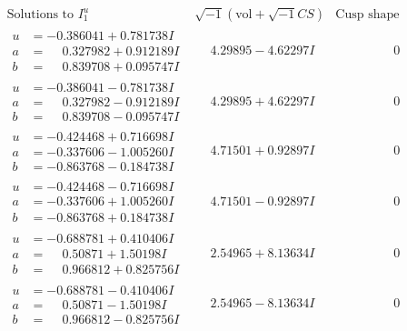 \documentclass[1p]{elsarticle_modified}
\theoremstyle{definition}
\newcommand{\I}{\sqrt{-1}}
\begin{document}
$$\begin{array}{c|c|c}  
\text{Solutions to }I^u_{1}& \I (\text{vol} + \sqrt{-1}CS) & \text{Cusp shape}\\
 \hline 
\begin{aligned}
u &= -0.386041 + 0.781738 I \\
a &= \phantom{-}0.327982 + 0.912189 I \\
b &= \phantom{-}0.839708 + 0.095747 I\end{aligned}
 & \phantom{-}4.29895 - 4.62297 I & \phantom{-0.000000 } 0 \\ \hline\begin{aligned}
u &= -0.386041 - 0.781738 I \\
a &= \phantom{-}0.327982 - 0.912189 I \\
b &= \phantom{-}0.839708 - 0.095747 I\end{aligned}
 & \phantom{-}4.29895 + 4.62297 I & \phantom{-0.000000 } 0 \\ \hline\begin{aligned}
u &= -0.424468 + 0.716698 I \\
a &= -0.337606 - 1.005260 I \\
b &= -0.863768 - 0.184738 I\end{aligned}
 & \phantom{-}4.71501 + 0.92897 I & \phantom{-0.000000 } 0 \\ \hline\begin{aligned}
u &= -0.424468 - 0.716698 I \\
a &= -0.337606 + 1.005260 I \\
b &= -0.863768 + 0.184738 I\end{aligned}
 & \phantom{-}4.71501 - 0.92897 I & \phantom{-0.000000 } 0 \\ \hline\begin{aligned}
u &= -0.688781 + 0.410406 I \\
a &= \phantom{-}0.50871 + 1.50198 I \\
b &= \phantom{-}0.966812 + 0.825756 I\end{aligned}
 & \phantom{-}2.54965 + 8.13634 I & \phantom{-0.000000 } 0 \\ \hline\begin{aligned}
u &= -0.688781 - 0.410406 I \\
a &= \phantom{-}0.50871 - 1.50198 I \\
b &= \phantom{-}0.966812 - 0.825756 I\end{aligned}
 & \phantom{-}2.54965 - 8.13634 I & \phantom{-0.000000 } 0 \\ \hline\begin{aligned}

\end{aligned}
\end{array}$$
\end{document}
